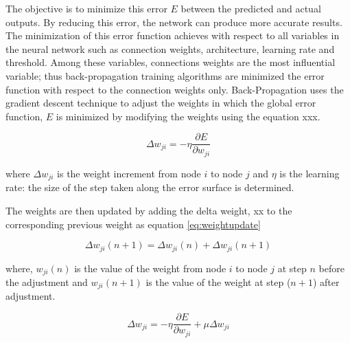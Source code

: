 The objective is to minimize this error $E$ between the predicted and actual outputs. By reducing this error, the network can produce more accurate results. The minimization of this error function achieves with respect to all variables in the neural network such as connection weights, architecture, learning rate and threshold. Among these variables, connections weights are the most influential variable; thus back-propagation training algorithms are minimized the error function with respect to the connection weights only. Back-Propagation uses the gradient descent technique to adjust the weights in which the global error function, $E$ is minimized by modifying the weights using the equation xxx.

\begin{equation}
\Delta{w_{ji}} = -\eta \frac{\partial E}{\partial w_{ji}}
\label{eq:gd}
\end{equation} 

where $\Delta{w_{ji}}$ is the weight increment from node $i$ to node $j$ and $\eta$ is the learning rate: the size of the step taken along the error surface is determined. 

The weights are then updated by adding the delta weight, xx to the corresponding previous weight as equation \ref{eq:weightupdate}

\begin{equation}
\Delta{w_{ji}}(n+1) = \Delta{w_{ji}}(n) + \Delta{w_{ji}}(n+1)
\label{eq:weightupdate}
\end{equation} 

where, $w_{ji}(n)$ is the value of the weight from node $i$ to node $j$ at step $n$ before the adjustment and $w_{ji}(n+1)$ is the value of the weight at step ($n+1$) after adjustment. 

\begin{equation}
\Delta{w_{ji}} = -\eta \frac{\partial E}{\partial w_{ji}} + \mu \Delta{w_{ji}}
\label{eq:momemtum}
\end{equation} 


